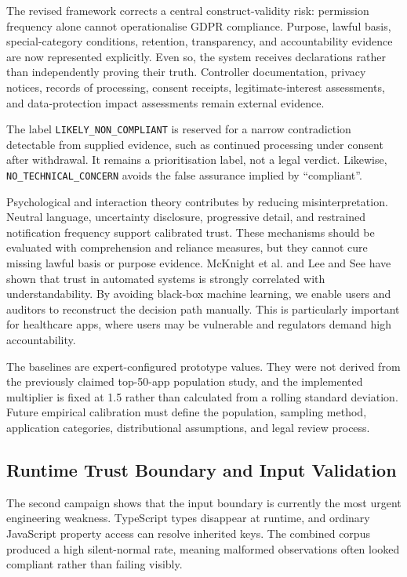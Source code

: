 The revised framework corrects a central construct-validity risk: permission frequency alone cannot operationalise GDPR compliance. Purpose, lawful basis, special-category conditions, retention, transparency, and accountability evidence are now represented explicitly. Even so, the system receives declarations rather than independently proving their truth. Controller documentation, privacy notices, records of processing, consent receipts, legitimate-interest assessments, and data-protection impact assessments remain external evidence.

The label \texttt{LIKELY\_NON\_COMPLIANT} is reserved for a narrow contradiction detectable from supplied evidence, such as continued processing under consent after withdrawal. It remains a prioritisation label, not a legal verdict. Likewise, \texttt{NO\_TECHNICAL\_CONCERN} avoids the false assurance implied by ``compliant''.

Psychological and interaction theory contributes by reducing misinterpretation. Neutral language, uncertainty disclosure, progressive detail, and restrained notification frequency support calibrated trust. These mechanisms should be evaluated with comprehension and reliance measures, but they cannot cure missing lawful basis or purpose evidence. McKnight et al. \cite{33} and Lee and See \cite{34} have shown that trust in automated systems is strongly correlated with understandability. By avoiding black‑box machine learning, we enable users and auditors to reconstruct the decision path manually. This is particularly important for healthcare apps, where users may be vulnerable and regulators demand high accountability.

The baselines are expert-configured prototype values. They were not derived from the previously claimed top-50-app population study, and the implemented multiplier is fixed at 1.5 rather than calculated from a rolling standard deviation. Future empirical calibration must define the population, sampling method, application categories, distributional assumptions, and legal review process.

\subsection{Runtime Trust Boundary and Input Validation}

The second campaign shows that the input boundary is currently the most urgent engineering weakness. TypeScript types disappear at runtime, and ordinary JavaScript property access can resolve inherited keys. The combined corpus produced a high silent-normal rate, meaning malformed observations often looked compliant rather than failing visibly.

